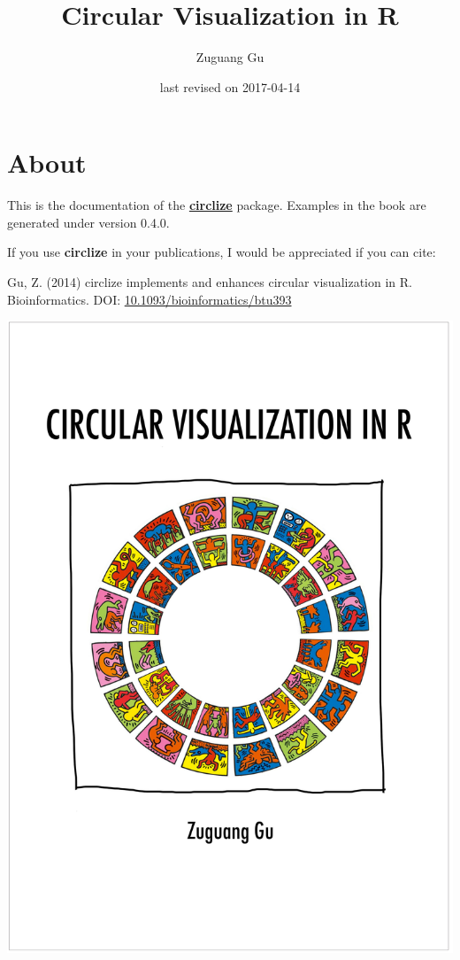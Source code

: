 \documentclass[]{book}
\title{Circular Visualization in R}
\author{Zuguang Gu}
\date{last revised on 2017-04-14}
\theoremstyle{definition}
\theoremstyle{definition}
\theoremstyle{remark}
\begin{document}
\maketitle

{
\setcounter{tocdepth}{1}
\tableofcontents
}
\chapter*{About}\label{about}

This is the documentation of the
\href{https://cran.r-project.org/package=circlize}{\textbf{circlize}}
package. Examples in the book are generated under version 0.4.0.

If you use \textbf{circlize} in your publications, I would be
appreciated if you can cite:

Gu, Z. (2014) circlize implements and enhances circular visualization in
R. Bioinformatics. DOI:
\href{https://doi.org/10.1093/bioinformatics/btu393}{10.1093/bioinformatics/btu393}

\begin{center}\includegraphics[width=34.44in]{images/circlize_cover} \end{center}
\end{document}
